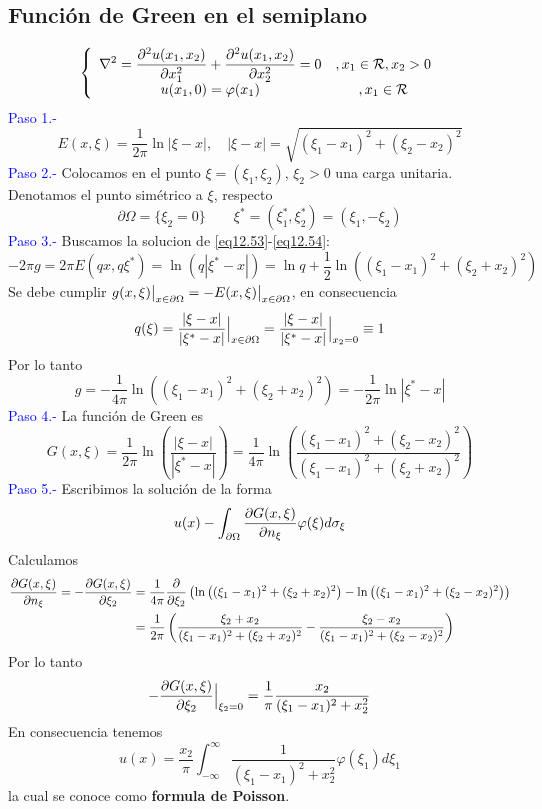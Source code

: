 \documentclass[../main]{subfiles}
\begin{document}
    \subsection{Función de Green en el semiplano}
    \begin{equation}
        \begin{split}
        \left\{
            \begin{array}{cc}
            \displaystyle \nabla^2=\pdv{^2 u(x_1,x_2)}{x_1^2}+\pdv{^2 u(x_1,x_2)}{x_2^2}=0    &, x_1 \in \mathcal{R}, x_2>0  \\
            u(x_1,0)=\varphi(x_1)     &, x_1 \in \mathcal{R} 
            \end{array}
        \right.
        \end{split}
    \end{equation}
    \textcolor{blue}{Paso 1.-} 
    \begin{equation}
        E(x,\xi)=\dfrac{1}{2\pi}\ln{|\xi-x|}, \quad |\xi-x|=\sqrt{(\xi_1-x_1)^2+(\xi_2-x_2)^2}
    \end{equation}
    \textcolor{blue}{Paso 2.-} Colocamos en el punto $\xi=(\xi_1, \xi_2)$, $\xi_2>0$ una carga unitaria. Denotamos el punto simétrico a $\xi$, respecto 
    $$
    \partial \Omega=\{ \xi_2=0 \} \qquad \xi^*=(\xi^*_1, \xi^*_2)=(\xi_1, -\xi_2)
    $$
    \textcolor{blue}{Paso 3.-} Buscamos la solucion de \eqref{eq12.53}-\eqref{eq12.54}:
    $$-2\pi g=2\pi E(qx,q\xi^*)=\ln{(q|\xi^*-x|)}=\ln{q}+\dfrac{1}{2}\ln{\left((\xi_1-x_1)^2+(\xi_2+x_2)^2\right)}$$
    Se debe cumplir $g(x,\xi)\big{|}_{x\in\partial\Omega}=-E(x,\xi)\big{|}_{x\in\partial\Omega}$, en consecuencia
    $$q(\xi)=\dfrac{|\xi-x|}{|\xi^*-x|}\Big{|}_{x\in\partial\Omega}=\dfrac{|\xi-x|}{|\xi^*-x|}\Big{|}_{x_2=0}\equiv 1$$
    Por lo tanto 
    $$g=-\dfrac{1}{4\pi}\ln{\left( (\xi_1-x_1)^2+(\xi_2+x_2)^2\right)}=-\dfrac{1}{2\pi}\ln{|\xi^*-x|}$$
    \textcolor{blue}{Paso 4.-} La función de Green es
    $$G(x,\xi)=\dfrac{1}{2\pi}\ln{\left( \dfrac{|\xi-x|}{|\xi^*-x|}\right)}=\dfrac{1}{4\pi}\ln{\left(\dfrac{(\xi_1-x_1)^2+(\xi_2-x_2)^2}{(\xi_1-x_1)^2+(\xi_2+x_2)^2}\right)}$$
    \textcolor{blue}{Paso 5.-} Escribimos la solución de la forma
    $$u(x)-\int_{\partial \Omega}\pdv{G(x,\xi)}{n_{\xi}}\varphi (\xi)d\sigma_{\xi}$$
    Calculamos
    \begin{align*}
        \pdv{G(x,\xi)}{n_{\xi}}=-\pdv{G(x,\xi)}{\xi_2}&=\dfrac{1}{4\pi}\pdv{}{\xi_2}\left( \ln{\left((\xi_1-x_1)^2+(\xi_2+x_2)^2\right)-\ln{\left( (\xi_1-x_1)^2+(\xi_2-x_2)^2\right)}}\right) \\
        &=\dfrac{1}{2\pi}\left( \dfrac{\xi_2+x_2}{(\xi_1-x_1)^2+(\xi_2+x_2)^2}-\dfrac{\xi_2-x_2}{(\xi_1-x_1)^2+(\xi_2-x_2)^2} \right)
    \end{align*}
    Por lo tanto 
    $$-\pdv{G(x,\xi)}{\xi_2}\Big{|}_{\xi_2=0}=\dfrac{1}{\pi}\dfrac{x_2}{(\xi_1-x_1)^2+x_2^2}$$
    En consecuencia tenemos
    \begin{equation}
        u(x)=\dfrac{x_2}{\pi}\int_{-\infty}^{\infty} \dfrac{1}{(\xi_1-x_1)^2+x_2^2}\varphi(\xi_1)d\xi_1
    \end{equation}
    la cual se conoce como \textbf{formula de Poisson}.
\end{document}

